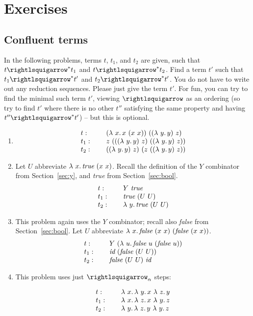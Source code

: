 \section{Exercises}

\subsection{Confluent terms}

In the following problems, terms $t$, $t_1$, and $t_2$ are given, such
that $t\betaa^* t_1$ and $t\betaa^* t_2$.  Find a term $t'$ such
that $t_1\betaa^* t'$ and $t_2\betaa^* t'$.  You do not have to
write out any reduction sequences.  Please just give the term $t'$.
For fun, you can try to find the minimal such term $t'$, viewing $\betaa$
as an ordering (so try to find $t'$ where there is no other $t''$
satisfying the same property and having $t''\betaa^* t'$) -- but
this is optional.

\begin{enumerate}
\item
\[
  \begin{array}{lll}
    t: & \ & (\lambda\ x.\, x\ (x\ x))\ ((\lambda\ y.\, y)\ z) \\
    t_1: & \ & z\ (((\lambda\ y.\, y)\ z)\ ((\lambda\ y.\, y)\ z))\\
    t_2: & \ & ((\lambda\ y.\, y)\ z)\ (z\ ((\lambda\ y.\, y)\ z))
  \end{array}
  \]

\item Let $U$ abbreviate $\lam{x}{\textit{true}\ (x\ x)}$.  Recall the definition of the $Y$ combinator from Section~\ref{sec:y}, and \textit{true} from Section~\ref{sec:bool}.
  \[
  \begin{array}{lll}
    t: & \ & Y\ \textit{true} \\
    t_1: & \ & \textit{true}\ (U\ U) \\
    t_2: & \ & \lambda\ y.\, \textit{true}\ (U\ U)
  \end{array}
  \]
  
\item This problem again uses the $Y$ combinator; recall also \textit{false} from Section~\ref{sec:bool}.  Let
  $U$ abbreviate $\lam{x}{\textit{false}\ (x\ x)\ (\textit{false}\ (x\ x))}$. 
\[
  \begin{array}{lll}
    t: & \ & Y\ (\lam{u}{\textit{false}\ u\ (\textit{false}\ u)}) \\
    t_1: & \ & \textit{id}\ (\textit{false}\ (U\ U)) \\
    t_2: & \ & \textit{false}\ (U\ U)\ \textit{id}
  \end{array}
  \]

\item This problem uses just $\curva_\alpha$ steps:

\[
  \begin{array}{lll}
    t: & \ &   \lambda\ x.\, \lambda\ y.\, x\ \lambda\ z.\, y\\
    t_1: & \ & \lambda\ x.\, \lambda\ z.\, x\ \lambda\ y.\, z \\
    t_2: & \ & \lambda\ y.\, \lambda\ z.\, y\ \lambda\ y.\, z
  \end{array}
  \]

\end{enumerate}

